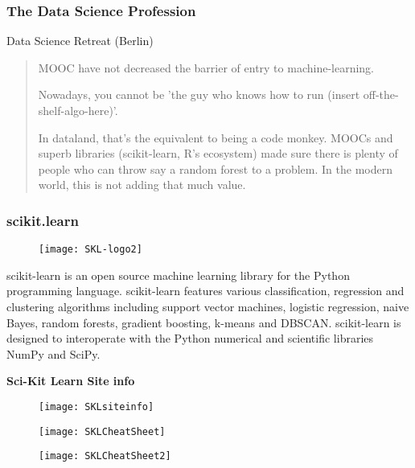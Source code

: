 \documentclass{beamer}
\begin{document}
 
 \frametitle{The Data Science Profession}
 Data Science Retreat (Berlin)
 \begin{quote}
  MOOC have not  decreased the barrier of entry to machine-learning.
  
  
  
  Nowadays, you cannot be 'the guy who knows how to run (insert off-the-shelf-algo-here)'. 
  
  
  In dataland, that's the equivalent to being a code monkey. MOOCs and superb libraries (scikit-learn, R's ecosystem) made 
  sure there is plenty of people who can throw say a random forest to a problem. In the modern world, this is not adding that much value. 
 \end{quote}
 

 
 \frametitle{scikit.learn}
 \begin{figure}
  \centering
  \texttt{[image: SKL-logo2]}
  
 \end{figure}
 
  
   scikit-learn is an open source machine learning library for the Python programming language. 
   scikit-learn features various classification, regression and clustering algorithms including support vector machines, logistic regression, naive Bayes, random forests, gradient boosting, k-means and DBSCAN.  scikit-learn is designed to interoperate with the Python numerical and scientific libraries NumPy and SciPy.
  
 
 
 \textbf{Sci-Kit Learn Site info}
 \begin{figure}
  \centering
  \texttt{[image: SKLsiteinfo]}
 \end{figure}
 
 
 \begin{figure}
  \centering
  \texttt{[image: SKLCheatSheet]}
  
 \end{figure}
 
 
 \begin{figure}
  \centering
  \texttt{[image: SKLCheatSheet2]}
  
 \end{figure}
 


%
\end{document}
